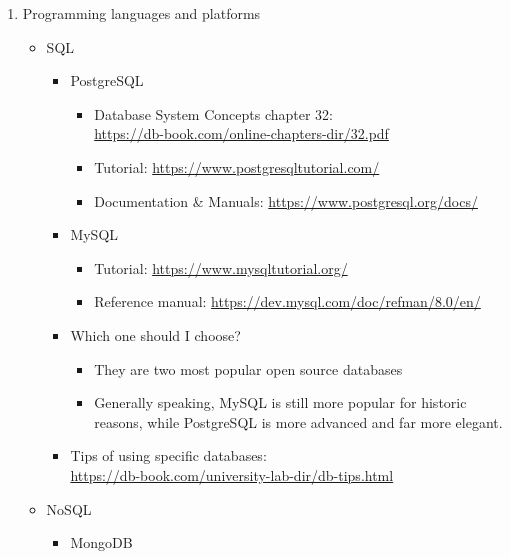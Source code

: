\documentclass{article}
\begin{document}
\begin{enumerate}
    \item Programming languages and platforms
    \begin{itemize}
        \item SQL
        \begin{itemize}
            \item PostgreSQL
            \begin{itemize}
                \item Database System Concepts chapter 32:\\
                \href{https://db-book.com/online-chapters-dir/32.pdf}{https://db-book.com/online-chapters-dir/32.pdf}
                \item Tutorial:
                \href{https://www.postgresqltutorial.com/}{https://www.postgresqltutorial.com/}
                \item Documentation \& Manuals:
                \href{https://www.postgresql.org/docs/}{https://www.postgresql.org/docs/}
            \end{itemize}     
            \item MySQL
            \begin{itemize}
                \item Tutorial:
                \href{https://www.mysqltutorial.org/}{https://www.mysqltutorial.org/}
                \item Reference manual:
                \href{https://dev.mysql.com/doc/refman/8.0/en/}{https://dev.mysql.com/doc/refman/8.0/en/}
            \end{itemize}
            \item Which one should I choose?
            \begin{itemize}
                \item They are two most popular open source databases
                \item Generally speaking, MySQL is still more popular for historic reasons, while PostgreSQL is more advanced and far more elegant.
            \end{itemize}
            \item Tips of using specific databases:\\
            \href{https://db-book.com/university-lab-dir/db-tips.html}{https://db-book.com/university-lab-dir/db-tips.html}
        \end{itemize}
        \item NoSQL
        \begin{itemize}
            \item MongoDB

\end{itemize}
\end{itemize}
\end{enumerate}
\end{document}
